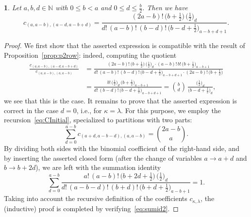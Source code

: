\documentclass[10pt,oneside,american]{amsart}
\numberwithin{equation}{section}
\numberwithin{figure}{section}
\theoremstyle{plain}
\newtheorem{thm}{\protect\theoremname}[section]
\theoremstyle{definition}
\theoremstyle{remark}
\theoremstyle{plain}
\theoremstyle{definition}
\theoremstyle{plain}
\theoremstyle{plain}
\providecommand{\theoremname}{Theorem}
\begin{document}
\begin{thm}\label{thm:cf2}
  Let $a,b,d\in\mathbb{N}$ with $0\leq b<a$ and $0\leq d\leq\frac{b}{2}$.
  Then we have
  \[
    c_{(a,a-b),(a-d,a-b+d)} = 
    \frac{(2a-b)! \, \bigl(b+\frac12\bigr) \, \bigl(\frac12\bigr)_{\!d}}
         {d! \, (a-b)! \, (b-d)! \, \bigl(b-d+\frac12\bigr)_{\!a-b+d+1}}.
  \]
\end{thm}
\begin{proof}
  We first show that the asserted expression is compatible with the result of
  Proposition~\ref{prop:p2row}: indeed, computing the quotient
  \begin{align*}
    \frac{c_{(a,a-b),(a-d,a-b+d)}}{c_{(a,a-b),(a,a-b)}} &=
    \frac{(2a-b)! \, \bigl(b+\frac12\bigr) \, \bigl(\frac12\bigr)_{\!d} \cdot
      (a-b)! \, b! \, \bigl(b+\frac12\bigr)_{\!a-b+1}}
      {d! \, (a-b)! \, (b-d)! \, \bigl(b-d+\frac12\bigr)_{\!a-b+d+1} \cdot
        (2a-b)! \, \bigl(b+\frac12\bigr)} \\
    &= \frac{b! \, \bigl(\frac12\bigr)_{\!d} \, \bigl(b+\frac12\bigr)_{\!a-b+1}}
      {d! \, (b-d)! \, \bigl(b-d+\frac12\bigr)_{\!a-b+d+1}}
    = \binom{b}{d}\,\frac{\bigl(\frac12\bigr)_{\!d}}{\bigl(b-d+\frac12\bigr)_{\!d}},
  \end{align*}
  we see that this is the case. It remains to prove that the asserted
  expression is correct in the case $d=0$, i.e., for $\kappa=\lambda$.  For
  this purpose, we employ the recursion~\eqref{eq:CInitial}, specialized to
  partitions with two parts:
  \begin{equation}\label{eq:CInitial2}
    \sum_{d=0}^{a-b} c_{(a+d,a-b-d),(a,a-b)} = \binom{2a-b}{a}.
  \end{equation}
  By dividing both sides with the binomial coefficient of the right-hand side,
  and by inserting the asserted closed form (after the change of variables
  $a\to a+d$ and $b\to b+2d$), we are left with the summation identity
  \begin{equation}\label{eq:sumid2}
    \sum_{d=0}^{a-b}
    \frac{a! \, (a-b)! \, \bigl(b+2d+\frac{1}{2}\bigr) \, \bigl(\frac{1}{2}\bigr)_{\!d}}
         {d! \, (a-b-d)! \, (b+d)! \, \bigl(b+d+\frac12\bigr)_{\!a-b+1}} = 1.
  \end{equation}
  Taking into account the recursive definition of the coefficients
  $c_{\kappa,\lambda}$, the (inductive) proof is completed by
  verifying~\eqref{eq:sumid2}.


\end{proof}
\end{document}
